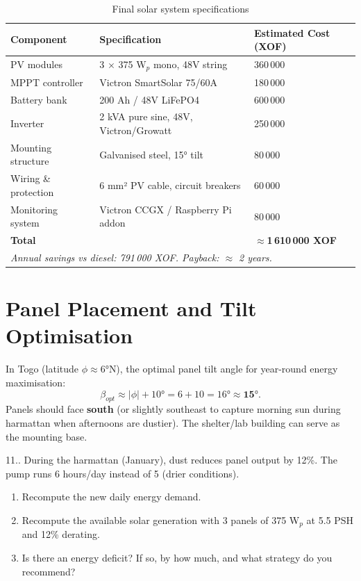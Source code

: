 \documentclass[12pt,a4paper,openany]{book}
\newcounter{exoctr}[chapter]
\renewcommand{\theexoctr}{\thechapter.\arabic{exoctr}}
\begin{document}
\begin{table}[H]
\centering
\caption{Final solar system specifications}
\label{tab:solar_specs}
\renewcommand{\arraystretch}{1.4}
\begin{tabular}{lll}
\toprule
\textbf{Component}&\textbf{Specification}&\textbf{Estimated Cost (XOF)}\\
\midrule
PV modules & 3 $\times$ 375 W$_p$ mono, 48V string & 360\,000\\
MPPT controller & Victron SmartSolar 75/60A & 180\,000\\
Battery bank & 200 Ah / 48V LiFePO4 & 600\,000\\
Inverter & 2 kVA pure sine, 48V, Victron/Growatt & 250\,000\\
Mounting structure & Galvanised steel, 15° tilt & 80\,000\\
Wiring \& protection & 6 mm² PV cable, circuit breakers & 60\,000\\
Monitoring system & Victron CCGX / Raspberry Pi addon & 80\,000\\
\midrule
\textbf{Total} & & \textbf{$\approx$1\,610\,000 XOF}\\
\midrule
\multicolumn{3}{l}{\textit{Annual savings vs diesel: 791\,000 XOF. Payback: $\approx$ 2 years.}}\\
\bottomrule
\end{tabular}
\end{table}

\section{Panel Placement and Tilt Optimisation}

In Togo (latitude $\phi\approx6°$N), the optimal panel tilt angle for year-round energy maximisation:
\begin{equation}
  \beta_{opt} \approx |\phi| + 10° = 6+10 = 16° \approx \mathbf{15°}.
\end{equation}
Panels should face \textbf{south} (or slightly southeast to capture morning sun during harmattan when afternoons are dustier). The shelter/lab building can serve as the mounting base.

\begin{exobox}{11.\theexoctr}
During the harmattan (January), dust reduces panel output by 12\%. The pump runs 6 hours/day instead of 5 (drier conditions).
\begin{enumerate}[label=(\alph*)]
  \item Recompute the new daily energy demand.
  \item Recompute the available solar generation with 3 panels of 375 W$_p$ at 5.5 PSH and 12\% derating.
  \item Is there an energy deficit? If so, by how much, and what strategy do you recommend?
\end{enumerate}
\end{exobox}
\end{document}
